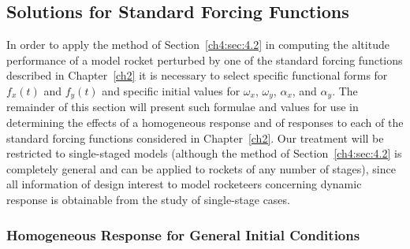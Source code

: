 \subsection{Solutions for Standard Forcing Functions}\label{ch4:sec:4.3}

In order to apply the method of Section~\ref{ch4:sec:4.2} in computing the altitude performance of
a model rocket perturbed by one of the standard forcing functions described in Chapter~\ref{ch2} it
is necessary to select specific functional forms for $f_x(t)$ and $f_y(t)$ and specific initial
values for $\omega_x$, $\omega_y$, $\alpha_x$, and $\alpha_y$. The remainder of this section will
present such formulae and values for use in determining the effects of a homogeneous response and
of responses to each of the standard forcing functions considered in Chapter~\ref{ch2}. Our
treatment will be restricted to single-staged models (although the method of
Section~\ref{ch4:sec:4.2} is completely general and can be applied to rockets of any number of
stages), since all information of design interest to model rocketeers concerning dynamic response
is obtainable from the study of single-stage cases.

\subsubsection{Homogeneous Response for General Initial Conditions}\label{ch4:sec:4.3.1}


